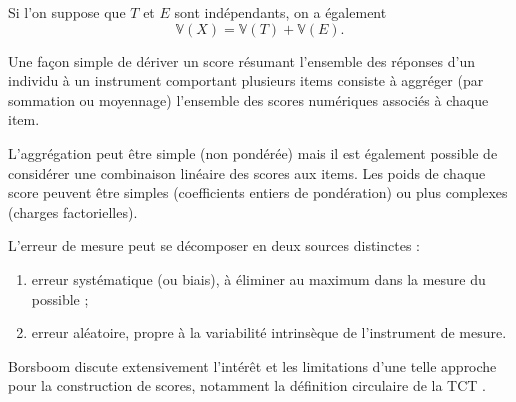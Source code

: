 Si l'on suppose que $T$ et $E$ sont indépendants, on a également
\[
\mathbb{V}(X) = \mathbb{V}(T)+\mathbb{V}(E).
\]


Une façon simple de dériver un score résumant l'ensemble des réponses d'un
individu à un instrument comportant plusieurs items consiste à aggréger (par
sommation ou moyennage) l'ensemble des scores numériques associés à chaque item.

L'aggrégation peut être simple (non pondérée) mais il est également possible de
considérer une combinaison linéaire des scores aux items. Les poids de chaque
score peuvent être simples (coefficients entiers de pondération) ou plus
complexes (charges factorielles).


L'erreur de mesure peut se décomposer en deux sources distinctes :
\begin{enumerate}
\item erreur systématique (ou biais), à éliminer au maximum dans la mesure du
  possible ; 
\item erreur aléatoire, propre à la variabilité intrinsèque de l'instrument de
  mesure. 
\end{enumerate}

Borsboom discute extensivement l'intérêt et les limitations d'une telle approche
pour la construction de scores, notamment la définition circulaire de la TCT \autocite{Borsboom2006,Borsboom2005}.






